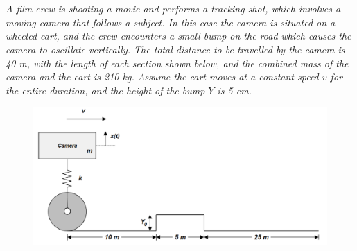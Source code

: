 \section{}

\textit{A film crew is shooting a movie and performs a tracking shot, which involves a moving camera that follows a subject. In this case the camera is situated on a wheeled cart, and the crew encounters a small bump on the road which causes the camera to oscillate vertically. The total distance to be travelled by the camera is 40 m, with the length of each section shown below, and the combined mass of the camera and the cart is 210 kg. Assume the cart moves at a constant speed $v$ for the entire duration, and the height of the bump $Y$ is 5 cm.}

\begin{figure}[H]
    \centering
    \includegraphics[width=0.5\linewidth]{Questions/Figures/Q2 Problem Diagram.png}
\end{figure}

